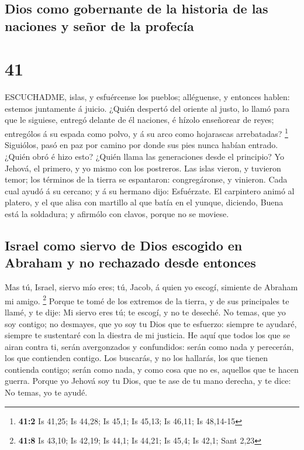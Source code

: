 \hypertarget{dios-como-gobernante-de-la-historia-de-las-naciones-y-seuxf1or-de-la-profecuxeda}{%
\subsection{Dios como gobernante de la historia de las naciones y señor
de la
profecía}\label{dios-como-gobernante-de-la-historia-de-las-naciones-y-seuxf1or-de-la-profecuxeda}}

\hypertarget{section-40}{%
\section{41}\label{section-40}}

 ESCUCHADME, islas, y esfuércense los pueblos; alléguense, y
entonces hablen: estemos juntamente á juicio.  ¿Quién
despertó del oriente al justo, lo llamó para que le siguiese, entregó
delante de él naciones, é hízolo enseñorear de reyes; entrególos á su
espada como polvo, y á su arco como hojarascas arrebatadas? \footnote{\textbf{41:2}
  Is 41,25; Is 44,28; Is 45,1; Is 45,13; Is 46,11; Is 48,14-15}
 Siguiólos, pasó en paz por camino por donde sus pies nunca
habían entrado.  ¿Quién obró é hizo esto? ¿Quién llama las
generaciones desde el principio? Yo Jehová, el primero, y yo mismo con
los postreros.  Las islas vieron, y tuvieron temor; los
términos de la tierra se espantaron: congregáronse, y vinieron.
 Cada cual ayudó á su cercano; y á su hermano dijo:
Esfuérzate.  El carpintero animó al platero, y el que alisa
con martillo al que batía en el yunque, diciendo, Buena está la
soldadura; y afirmólo con clavos, porque no se moviese.

\hypertarget{israel-como-siervo-de-dios-escogido-en-abraham-y-no-rechazado-desde-entonces}{%
\subsection{Israel como siervo de Dios escogido en Abraham y no
rechazado desde
entonces}\label{israel-como-siervo-de-dios-escogido-en-abraham-y-no-rechazado-desde-entonces}}

 Mas tú, Israel, siervo mío eres; tú, Jacob, á quien yo
escogí, simiente de Abraham mi amigo. \footnote{\textbf{41:8} Is 43,10;
  Is 42,19; Is 44,1; Is 44,21; Is 45,4; Is 42,1; Sant 2,23} 
Porque te tomé de los extremos de la tierra, y de sus principales te
llamé, y te dije: Mi siervo eres tú; te escogí, y no te deseché.
 No temas, que yo soy contigo; no desmayes, que yo soy tu
Dios que te esfuerzo: siempre te ayudaré, siempre te sustentaré con la
diestra de mi justicia.  He aquí que todos los que se airan
contra ti, serán avergonzados y confundidos: serán como nada y
perecerán, los que contienden contigo.  Los buscarás, y no
los hallarás, los que tienen contienda contigo; serán como nada, y como
cosa que no es, aquellos que te hacen guerra.  Porque yo
Jehová soy tu Dios, que te ase de tu mano derecha, y te dice: No temas,
yo te ayudé.

